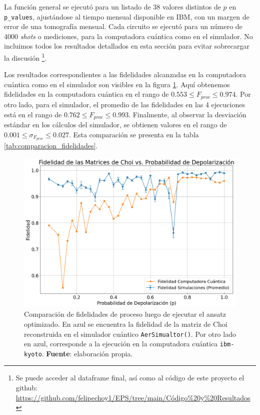 \documentclass[letterpaper,12pt]{thesisECFM}
\theoremstyle{plain}
\theoremstyle{definition}
\theoremstyle{remark}
\newcommand{\1}{\mathbb{1}}
\begin{document}
La función general se ejecutó para un listado de 38 valores distintos de $p$ en
\texttt{p\_values}, ajustándose al tiempo mensual disponible en IBM, con un
margen de error de una tomografía mensual. Cada circuito se ejecutó para un
número de 4000 \textit{shots} o mediciones, para la computadora cuántica como
en el simulador. No incluimos todos los resultados detallados en esta sección
para evitar sobrecargar la discusión \footnote{Se puede acceder al dataframe
final, así como al código de este proyecto el github:
\href{https://github.com/felipechoy1/EPS/tree/main/Código\%20y\%20Resultados}{https://github.com/felipechoy1/EPS/tree/main/Código\%20y\%20Resultados}}.

Los resultados correspondientes a las fidelidades alcanzadas en la computadora
cuántica como en el simulador son visibles en la figura
\ref{fig:comparacion_fidelidad}. Aquí obtenemos fidelidades en la computadora
cuántica en el rango de $0.553\leq F_{proc} \leq 0.974$. Por otro lado, para el
simulador, el promedio de las fidelidades en las 4 ejecuciones está en el rango
de $0.762\leq F_{proc} \leq 0.993$. Finalmente, al observar la desviación
estándar en los cálculos del simulador, se obtienen valores en el rango de
$0.001\leq \sigma_{F_{proc}} \leq 0.027$. Esta comparación se presenta en la
tabla \ref{tab:comparacion_fidelidades}.



\begin{figure}[h!] 
    \centering 
    \includegraphics[width=0.7\linewidth]{imagenes/comparacion fidelidad.png}
    \caption{Comparación de fidelidades de proceso luego de ejecutar el ansatz
optimizado. En azul se encuentra la fidelidad de la matriz de Choi reconstruida
en el simulador cuántico \texttt{AerSimualtor()}. Por otro lado en azul,
corresponde a la ejecución en la computadora cuántica \texttt{ibm-kyoto}.
\textbf{Fuente}: elaboración propia. }
    \label{fig:comparacion_fidelidad}
    \end{figure}
    
\end{document}
